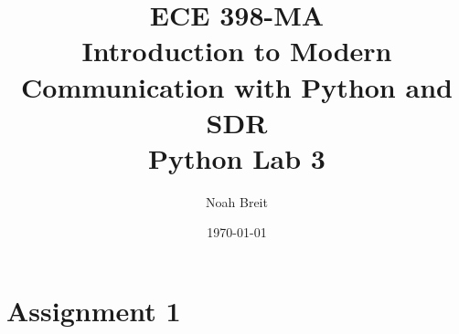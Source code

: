 \documentclass[
	letterpaper, %
	10pt, %
]{CSUniSchoolLabReport}
\title{ECE 398-MA \\ Introduction to Modern Communication with Python and SDR \\ Python Lab 3} %
\author{Noah Breit} %
\date{\today} %
\begin{document}
\maketitle %




\section{Assignment 1}
\end{document}
